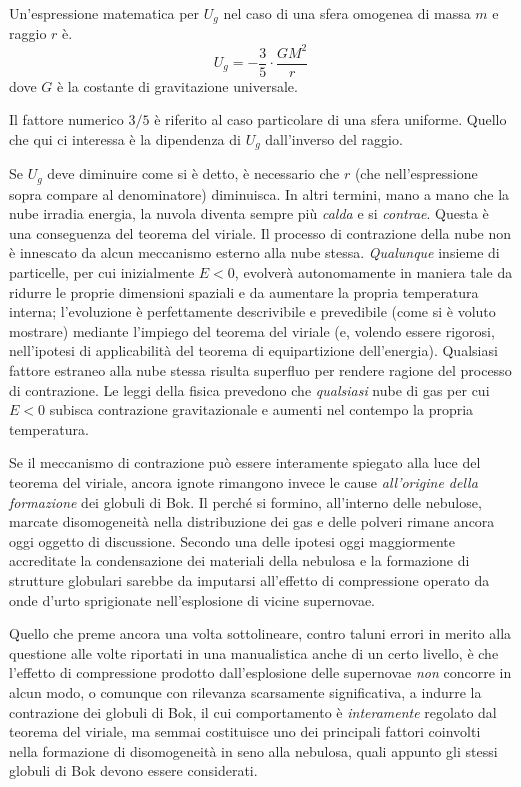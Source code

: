 Un'espressione matematica per $U_{g}$ nel caso di una sfera omogenea di massa
$m$ e raggio $r$ \`{e}.
\begin{equation}\label{epropriag}
U_{g} = - \frac{3}{5} \cdot \frac{GM^{2}}{r}
\end{equation}
dove $G$ \`{e} la costante di gravitazione universale.
\par
Il fattore numerico $3/5$ \`{e} riferito al caso particolare di una sfera uniforme. Quello che qui ci interessa \`{e} la dipendenza di $U_{g}$ dall'inverso del raggio.
\par
Se $U_{g}$ deve diminuire come si \`{e} detto, \`{e} necessario che $r$ (che nell'espressione sopra compare al denominatore) diminuisca.
In altri termini, mano a mano che la nube irradia energia, la nuvola diventa sempre pi\`{u} \emph{calda} e si \emph{contrae}. 
Questa \`{e} una conseguenza del teorema del viriale.
Il processo di contrazione della nube non \`{e} innescato da alcun meccanismo esterno alla nube stessa.
\emph{Qualunque} insieme di particelle, per cui inizialmente $E<0$, evolver\`{a} autonomamente in maniera tale da ridurre le proprie dimensioni spaziali e da aumentare la propria temperatura interna; l'evoluzione \`{e} perfettamente descrivibile e prevedibile (come si \`{e} voluto mostrare) mediante l'impiego del teorema del viriale (e, volendo essere rigorosi, nell'ipotesi di applicabilit\`{a} del teorema di equipartizione dell'energia).
Qualsiasi fattore estraneo alla nube stessa risulta superfluo per rendere ragione del processo di contrazione.
Le leggi della fisica prevedono che \emph{qualsiasi} nube di gas per cui $E<0$ subisca contrazione gravitazionale e aumenti nel contempo la propria temperatura.
\par
Se il meccanismo di contrazione pu\`o essere interamente spiegato alla luce del teorema del viriale, ancora ignote rimangono invece le cause \emph{all'origine della formazione} dei globuli di Bok.
Il perch\'{e} si formino, all'interno delle nebulose, marcate disomogeneit\`{a} nella distribuzione dei gas e delle polveri rimane ancora oggi oggetto di discussione.
Secondo una delle ipotesi oggi maggiormente accreditate la condensazione dei materiali della nebulosa e la formazione di strutture globulari sarebbe da imputarsi all'effetto di compressione operato da onde d'urto sprigionate nell'esplosione di vicine supernovae.
\par
Quello che preme ancora una volta sottolineare, contro taluni errori in merito alla questione alle volte riportati in una manualistica anche di un certo livello,  \`{e} che l'effetto di compressione prodotto dall'esplosione delle supernovae \emph{non} concorre in alcun modo, o comunque con rilevanza scarsamente significativa, a indurre la contrazione dei globuli di Bok, il cui comportamento \`{e} \emph{interamente} regolato dal teorema del viriale, ma semmai costituisce uno dei principali fattori coinvolti nella formazione di disomogeneit\`{a} in seno alla nebulosa, quali appunto gli stessi globuli di Bok devono essere considerati.
